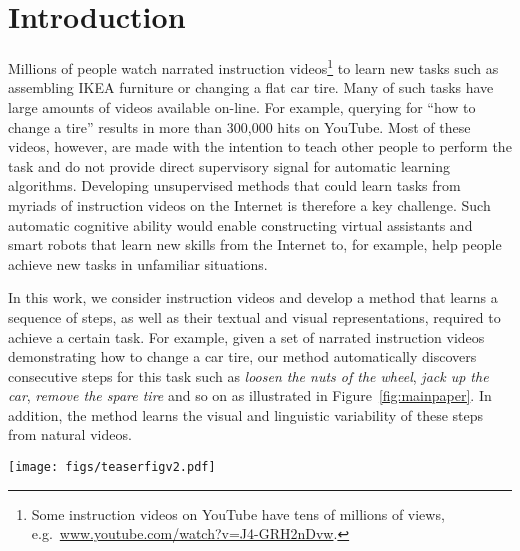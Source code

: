\documentclass[10pt,twocolumn,letterpaper]{article}
\begin{document}
\section{Introduction}
Millions of people watch narrated instruction videos\footnote{Some instruction videos on YouTube have tens of millions of views, 
e.g.~\url{www.youtube.com/watch?v=J4-GRH2nDvw}.} to learn new tasks such as assembling IKEA furniture or changing a flat car tire. 
Many of such tasks have large amounts of videos available on-line. For example, querying for ``how to change a tire'' results in more than 300,000 hits on YouTube.
Most of these videos, however, are made with the intention to teach other people to perform the task and do not provide direct supervisory signal for automatic learning algorithms. Developing unsupervised methods that could learn tasks from myriads of instruction videos on the Internet is therefore a key challenge.
%
Such automatic cognitive ability would enable constructing virtual assistants and smart robots that learn new skills from the Internet to, for example, help people achieve new tasks in unfamiliar situations. 

%
%
%
%
%




%

In this work, we consider instruction videos and develop a method that learns a sequence of steps, as well as their textual and visual representations, required to achieve a certain task. 
For example, given a set of narrated instruction videos demonstrating how to change a car tire, our method automatically discovers consecutive steps for this task such as {\em loosen the nuts of the wheel}, {\em jack up the car}, {\em remove the spare tire} and so on as illustrated in Figure~\ref{fig:mainpaper}. 
In addition, the method learns the visual and linguistic variability of these steps from natural videos.
%

 \begin{figure*}[t]
       \centering
       \texttt{[image: figs/teaserfigv2.pdf]}
     \caption{\small Given a set of narrated instruction videos demonstrating a particular task, we wish to automatically discover the main steps to achieve the task and associate each step with its corresponding narration and appearance in each video. Here frames from two videos demonstrating changing the car tire are shown, together with excerpts of the corresponding narrations.  Note the large variations in both the narration and appearance of the different steps highlighted by the same colors in both videos (here only three steps are shown).}
     \vspace{-4mm}
     \label{fig:mainpaper}
 \end{figure*}
\end{document}
